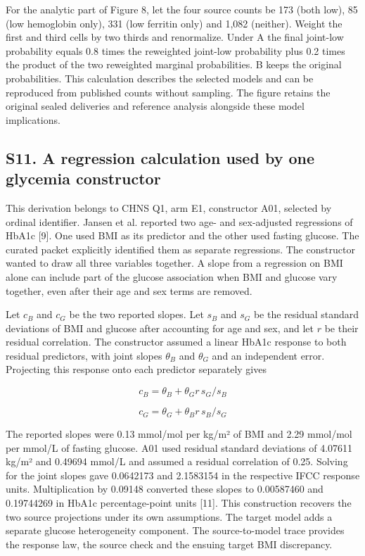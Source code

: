 \documentclass[11pt,letterpaper]{article}
\begin{document}
For the analytic part of Figure 8, let the four source counts be 173 (both low), 85 (low hemoglobin only), 331 (low ferritin only) and 1,082 (neither). Weight the first and third cells by two thirds and renormalize. Under A the final joint-low probability equals 0.8 times the reweighted joint-low probability plus 0.2 times the product of the two reweighted marginal probabilities. B keeps the original probabilities. This calculation describes the selected models and can be reproduced from published counts without sampling. The figure retains the original sealed deliveries and reference analysis alongside these model implications.


\subsection*{S11. A regression calculation used by one glycemia constructor}

This derivation belongs to CHNS Q1, arm E1, constructor A01, selected by ordinal identifier. Jansen et al. reported two age- and sex-adjusted regressions of HbA1c [9]. One used BMI as its predictor and the other used fasting glucose. The curated packet explicitly identified them as separate regressions. The constructor wanted to draw all three variables together. A slope from a regression on BMI alone can include part of the glucose association when BMI and glucose vary together, even after their age and sex terms are removed.


Let \(c_B\) and \(c_G\) be the two reported slopes. Let \(s_B\) and \(s_G\) be the residual standard deviations of BMI and glucose after accounting for age and sex, and let \(r\) be their residual correlation. The constructor assumed a linear HbA1c response to both residual predictors, with joint slopes \(\theta_B\) and \(\theta_G\) and an independent error. Projecting this response onto each predictor separately gives


\[
c_B = \theta_B + \theta_G r\,s_G/s_B
\]

\[
c_G = \theta_G + \theta_B r\,s_B/s_G
\]

The reported slopes were 0.13 mmol/\allowbreak{}mol per kg/\allowbreak{}m² of BMI and 2.29 mmol/\allowbreak{}mol per mmol/\allowbreak{}L of fasting glucose. A01 used residual standard deviations of 4.07611 kg/\allowbreak{}m² and 0.49694 mmol/\allowbreak{}L and assumed a residual correlation of 0.25. Solving for the joint slopes gave 0.0642173 and 2.1583154 in the respective IFCC response units. Multiplication by 0.09148 converted these slopes to 0.00587460 and 0.19744269 in HbA1c percentage-point units [11]. This construction recovers the two source projections under its own assumptions. The target model adds a separate glucose heterogeneity component. The source-to-model trace provides the response law, the source check and the ensuing target BMI discrepancy.
\end{document}
